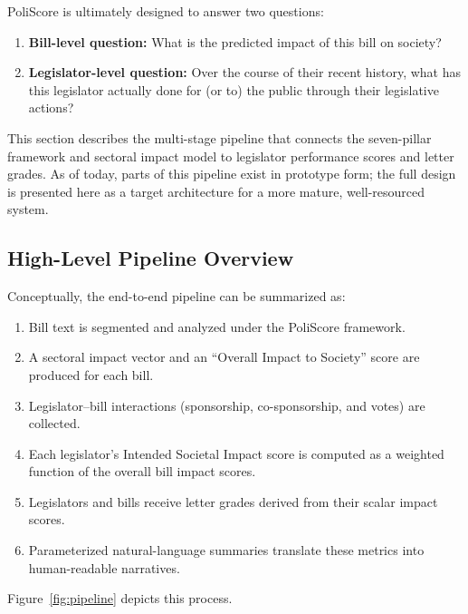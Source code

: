 \documentclass[12pt]{article}
\begin{document}
PoliScore is ultimately designed to answer two questions:

\begin{enumerate}
    \item \textbf{Bill-level question:} What is the predicted impact of this bill on society?
    \item \textbf{Legislator-level question:} Over the course of their recent history, what has this legislator actually
    done for (or to) the public through their legislative actions?
\end{enumerate}

This section describes the multi-stage pipeline that connects the seven-pillar framework and sectoral impact model to
legislator performance scores and letter grades. As of today, parts of this pipeline exist in prototype form; the full
design is presented here as a target architecture for a more mature, well-resourced system.

\subsection{High-Level Pipeline Overview}

Conceptually, the end-to-end pipeline can be summarized as:

\begin{enumerate}
    \item Bill text is segmented and analyzed under the PoliScore framework.
    \item A sectoral impact vector and an ``Overall Impact to Society'' score are produced for each bill.
    \item Legislator--bill interactions (sponsorship, co-sponsorship, and votes) are collected.
    \item Each legislator's Intended Societal Impact score is computed as a weighted function of the overall bill impact
          scores.
    \item Legislators and bills receive letter grades derived from their scalar impact scores.
    \item Parameterized natural-language summaries translate these metrics into human-readable narratives.
\end{enumerate}

Figure~\ref{fig:pipeline} depicts this process.
\end{document}
